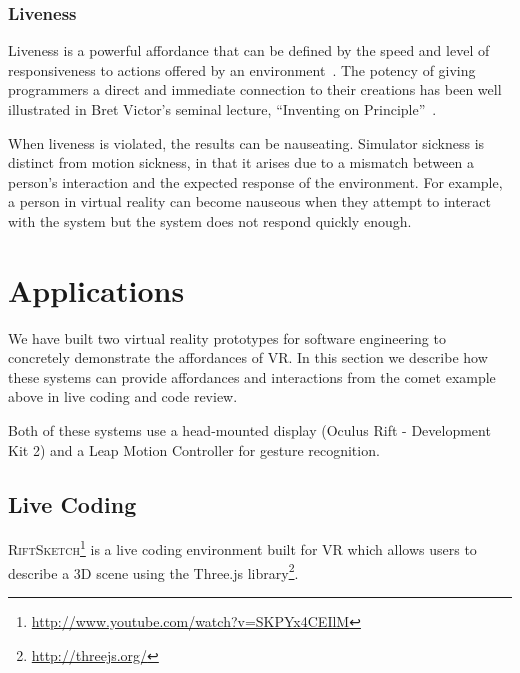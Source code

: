 \documentclass[conference]{IEEEtran}
\begin{document}


\subsubsection{Liveness}

Liveness is a powerful affordance that can be defined by the speed and level of responsiveness to actions offered by an environment~\cite{Tanimoto:Liveness}.
The potency of giving programmers a direct and immediate connection to their creations has been well illustrated in Bret Victor's seminal lecture, ``Inventing on Principle''~\cite{Victor:InventingOnPrincipleVideo}.%

When liveness is violated, the results can be nauseating.
Simulator sickness is distinct from motion sickness, in that it arises due to a mismatch between a person's interaction and the expected response of the environment.
For example, a person in virtual reality can become nauseous when they attempt to interact with the system but the system does not respond quickly enough.





\section{Applications}

We have built two virtual reality prototypes for software engineering to concretely demonstrate the affordances of VR.
In this section we describe how these systems can provide affordances and interactions from the comet example above in live coding and code review.

Both of these systems use a head-mounted display (Oculus Rift - Development Kit 2) and a Leap Motion Controller for gesture recognition.


\subsection{Live Coding}

\textsc{RiftSketch}\footnote{\url{http://www.youtube.com/watch?v=SKPYx4CEIlM}} is a live coding environment built for VR which allows users to describe a 3D scene using the Three.js library\footnote{\url{http://threejs.org/}}.
\end{document}
